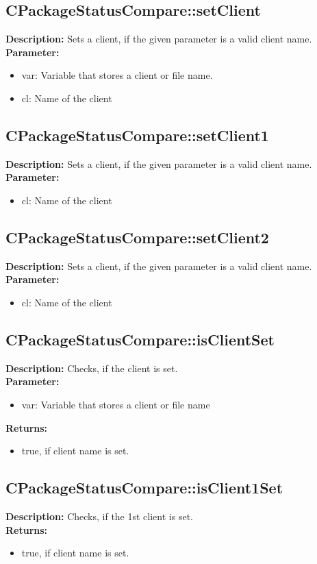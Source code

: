 \subsection{CPackageStatusCompare::setClient}
\textbf{Description:} Sets a client, if the given parameter is a valid client name.\\
\textbf{Parameter:}
\begin{itemize}
\item var: Variable that stores a client or file name.
\item cl: Name of the client
\end{itemize}

\subsection{CPackageStatusCompare::setClient1}
\textbf{Description:} Sets a client, if the given parameter is a valid client name.\\
\textbf{Parameter:}
\begin{itemize}
\item cl: Name of the client
\end{itemize}

\subsection{CPackageStatusCompare::setClient2}
\textbf{Description:} Sets a client, if the given parameter is a valid client name.\\
\textbf{Parameter:}
\begin{itemize}
\item cl: Name of the client
\end{itemize}

\subsection{CPackageStatusCompare::isClientSet}
\textbf{Description:} Checks, if the client is set.\\
\textbf{Parameter:}
\begin{itemize}
\item var: Variable that stores a client or file name
\end{itemize}
\textbf{Returns:}
\begin{itemize}
\item true, if client name is set.
\end{itemize}

\subsection{CPackageStatusCompare::isClient1Set}
\textbf{Description:} Checks, if the 1st client is set.\\
\textbf{Returns:}
\begin{itemize}
\item true, if client name is set.
\end{itemize}

